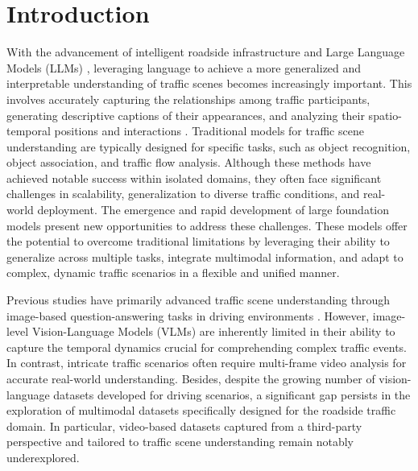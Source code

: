 
\section{Introduction}



With the advancement of intelligent roadside infrastructure and Large Language Models (LLMs) \cite{grattafiori2024llama3herdmodels}, leveraging language to achieve a more generalized and interpretable understanding of traffic scenes becomes increasingly important. This involves accurately capturing the relationships among traffic participants, generating descriptive captions of their appearances, and analyzing their spatio-temporal positions and interactions \cite{ITSsurvey,zhou2024gpt4vtrafficassistantindepth}. Traditional models for traffic scene understanding are typically designed for specific tasks, such as object recognition, object association, and traffic flow analysis. Although these methods have achieved notable success within isolated domains, they often face significant challenges in scalability, generalization to diverse traffic conditions, and real-world deployment. The emergence and rapid development of large foundation models \cite{llava,vlmsurvey} present new opportunities to address these challenges. These models offer the potential to overcome traditional limitations by leveraging their ability to generalize across multiple tasks, integrate multimodal information, and adapt to complex, dynamic traffic scenarios in a flexible and unified manner.
 
Previous studies have primarily advanced traffic scene understanding through image-based question-answering tasks in driving environments \cite{drivelm,zhou2024embodied,qian2024nuscenes}. However, image-level Vision-Language Models (VLMs) are inherently limited in their ability to capture the temporal dynamics crucial for comprehending complex traffic events. In contrast, intricate traffic scenarios often require multi-frame video analysis for accurate real-world understanding. Besides, despite the growing number of vision-language datasets developed for driving scenarios, a significant gap persists in the exploration of multimodal datasets specifically designed for the roadside traffic domain. In particular, video-based datasets captured from a third-party perspective and tailored to traffic scene understanding remain notably underexplored. 

